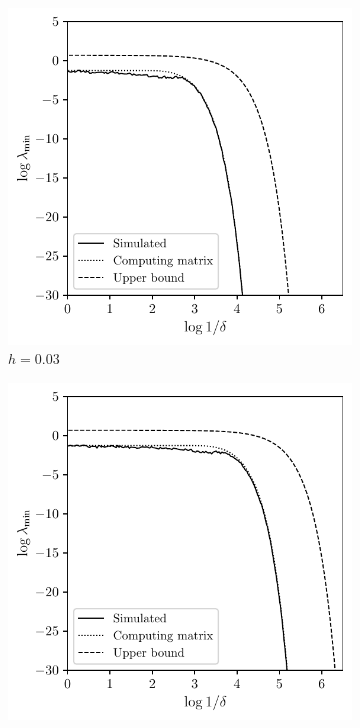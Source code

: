 \begin{figure}[ht]
  \centering
  \begin{subfigure}{0.49\textwidth}
    \centering
    \includegraphics[scale=0.64]{graphics/sim_2.pdf}
    \caption{$h = 0.03$}
  \end{subfigure}
  \begin{subfigure}{0.49\textwidth}
    \centering
    \includegraphics[scale=0.64]{graphics/sim_1.pdf}

\end{subfigure}
\end{figure}
